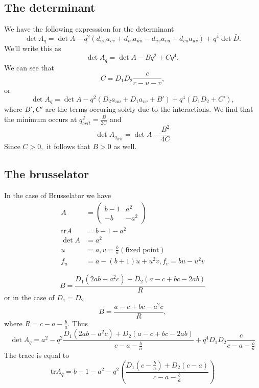 \documentclass{article}
\newcommand{\tr}{\text{tr}}
\begin{document}
\subsection{The determinant}
We have the following expresssion for the determinant
\begin{equation}
\det A_q = \det A - q^2(d_{uu}a_{vv}+d_{vv}a_{uu}-d_{uv}a_{vu}-d_{vu}a_{uv})+q^4 \det \bar{D}.
\end{equation}
We'll write this as
\begin{equation}
\det A_q = \det A - Bq^2 + C q^4,
\end{equation}
We can see that
\begin{equation}
C = D_1D_2\frac{c}{c-u-v},
\end{equation}
or
\begin{equation}
\det A_q = \det A - q^2(D_{2}a_{uu}+D_1a_{vv} + B') + q^4 (D_1 D_2 + C'),
\end{equation}
where $B',C'$ are the terms occuring solely due to the interactions.
We find that the minimum occurs at $q_{crit}^2 = \frac {B}{2C}$ and
\begin{equation}
\det A_{q_{crit}} = \det A - \frac{B^2}{4C}
\end{equation}
Since $C>0,$ it follows that $B>0$ as well.

\subsection{The brusselator}
In the case of Brusselator we have
\begin{align}
A&=\begin{pmatrix}b-1& a^2 \\ -b &-a^2\end{pmatrix}\\
\tr A &= b-1-a^2\\
\det A&= a^2\\
u&=a,v=\frac{b}{a} (\text{fixed point})\\
f_u &= a-(b+1)u+u^2v, f_v = bu-u^2v
\end{align}

\begin{equation}
B=\frac{D_1(2ab-a^2c)+D_2(a-c+bc-2ab)}{R}
\end{equation} or in the case of $D_1 = D_2$
\begin{equation}
B = \frac{a-c+bc-a^2c}{R},
\end{equation}
where $R = c-a-\frac ba$.
Thus
\begin{equation}
\det A_q = a^2 - q^2\frac{D_1(2ab-a^2c)+D_2(a-c+bc-2ab)}{c-a-\frac{b}{a}}+q^4 D_1D_2\frac{c}{c-a-\frac{b}{a}}
\end{equation}
The trace is equal to
\begin{equation}
\tr A_q = b-1-a^2 - q^2 (\frac{D_1(c-\frac{b}{a})+D_2(c-a)}{c-a-\frac{b}{a}})
\end{equation}
\end{document}
